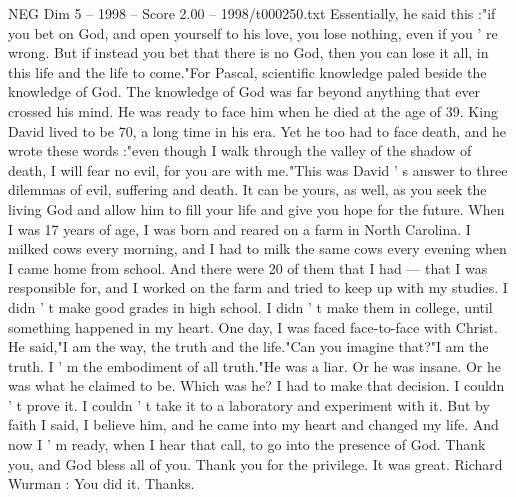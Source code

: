 \begin{textsample}{NEG Dim 5 – 1998 – Score 2.00 – 1998/t000250.txt}
Essentially, he said this :"if you bet on God, and open yourself to his love, you lose nothing, even if you ' re wrong.
But if instead you bet that there is no God, then you can lose it all, in this life and the life to come."For Pascal, scientific knowledge paled beside the knowledge of God.
The knowledge of God was far beyond anything that ever crossed his mind.
He was ready to face him when he died at the age of 39.
King David lived to be 70, a long time in his era.
Yet he too had to face death, and he wrote these words :"even though I walk through the valley of the shadow of death, I will fear no evil, for you are with me."This was David ' s answer to three dilemmas of evil, suffering and death.
It can be yours, as well, as you seek the living God and allow him to fill your life and give you hope for the future.
When I was 17 years of age, I was born and reared on a farm in North Carolina.
I milked cows every morning, and I had to milk the same cows every evening when I came home from school.
And there were 20 of them that I had — that I was responsible for, and I worked on the farm and tried to keep up with my studies.
I didn ' t make good grades in high school.
I didn ' t make them in college, until something happened in my heart.
One day, I was faced face-to-face with Christ.
He said,"I am the way, the truth and the life."Can you imagine that?"I am the truth.
I ' m the embodiment of all truth."He was a liar.
Or he was insane.
Or he was what he claimed to be.
Which was he?
I had to make that decision.
I couldn ' t prove it.
I couldn ' t take it to a laboratory and experiment with it.
But by faith I said, I believe him, and he came into my heart and changed my life.
And now I ' m ready, when I hear that call, to go into the presence of God.
Thank you, and God bless all of you.
Thank you for the privilege.
It was great.
Richard Wurman : You did it.
Thanks.

\end{textsample}
